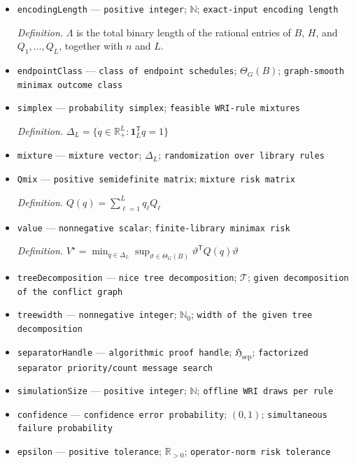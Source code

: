 \documentclass{article}
\begin{document}
\begin{itemize}
  \item \texttt{encodingLength} --- \texttt{positive integer}; \(\mathbb N\); \texttt{exact-\allowbreak{}input encoding length}
  \par\smallskip\noindent\emph{Definition.} \(\Lambda\) is the total binary length of the rational entries of \(B\), \(H\), and \(Q_1,\ldots,Q_L\), together with \(n\) and \(L\).
  \item \texttt{endpointClass} --- \texttt{class of endpoint schedules}; \(\Theta_G(B)\); \texttt{graph-\allowbreak{}smooth minimax outcome class}
  \item \texttt{simplex} --- \texttt{probability simplex}; \texttt{feasible WRI-\allowbreak{}rule mixtures}
  \par\smallskip\noindent\emph{Definition.} \(\Delta_L=\{q\in\mathbb R_{+}^{L}:\mathbf 1_L^{\mathsf T}q=1\}\)
  \item \texttt{mixture} --- \texttt{mixture vector}; \(\Delta_L\); \texttt{randomization over library rules}
  \item \texttt{Qmix} --- \texttt{positive semidefinite matrix}; \texttt{mixture risk matrix}
  \par\smallskip\noindent\emph{Definition.} \(Q(q)=\sum_{\ell=1}^{L}q_{\ell}Q_{\ell}\)
  \item \texttt{value} --- \texttt{nonnegative scalar}; \texttt{finite-\allowbreak{}library minimax risk}
  \par\smallskip\noindent\emph{Definition.} \(V^{\star}=\min_{q\in\Delta_L}\sup_{\vartheta\in\Theta_G(B)}\vartheta^{\mathsf T}Q(q)\vartheta\)
  \item \texttt{treeDecomposition} --- \texttt{nice tree decomposition}; \(\mathcal T\); \texttt{given decomposition of the conflict graph}
  \item \texttt{treewidth} --- \texttt{nonnegative integer}; \(\mathbb N_0\); \texttt{width of the given tree decomposition}
  \item \texttt{separatorHandle} --- \texttt{algorithmic proof handle}; \(\mathfrak H_{\mathrm{sep}}\); \texttt{factorized separator priority/\allowbreak{}count message search}
  \item \texttt{simulationSize} --- \texttt{positive integer}; \(\mathbb N\); \texttt{offline WRI draws per rule}
  \item \texttt{confidence} --- \texttt{confidence error probability}; \((0,1)\); \texttt{simultaneous failure probability}
  \item \texttt{epsilon} --- \texttt{positive tolerance}; \(\mathbb R_{>0}\); \texttt{operator-\allowbreak{}norm risk tolerance}

\end{itemize}
\end{document}
